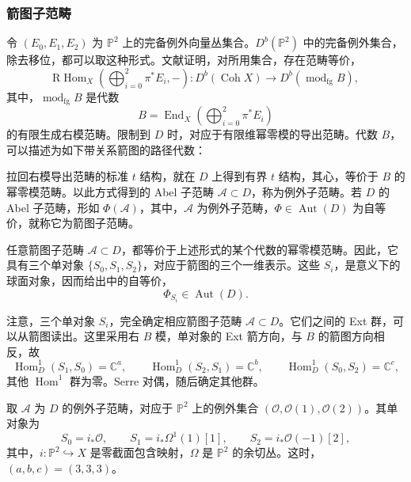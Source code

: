 \subsubsection{箭图子范畴}\label{sec:5.8.3.1}

令 $(E_0,E_1,E_2)$ 为 $\mathbb{P}^2$ 上的完备例外向量丛集合。$D^b(\mathbb{P}^2)$ 中的完备例外集合，除去移位，都可以取这种形式。文献证明，对所用集合，存在范畴等价，
\[
\mathrm{R}\operatorname{Hom}_X\!\left(\bigoplus_{i=0}^2\pi^*E_i,-\right)
\colon D^b(\operatorname{Coh}X)\longrightarrow D^b(\operatorname{mod}_{\mathrm{fg}}B),
\]
其中，$\operatorname{mod}_{\mathrm{fg}}B$ 是代数
\[
B=\operatorname{End}_X\!\left(\bigoplus_{i=0}^2\pi^*E_i\right)
\]
的有限生成右模范畴。限制到 $D$ 时，对应于有限维幂零模的导出范畴。代数 $B$，可以描述为如下带关系箭图的路径代数：
\begin{figure}[H]
\centering
{}
\end{figure}

拉回右模导出范畴的标准 $t$ 结构，就在 $D$ 上得到有界 $t$ 结构，其心，等价于 $B$ 的幂零模范畴。以此方式得到的 Abel 子范畴 $\mathcal{A}\subset D$，称为例外子范畴。若 $D$ 的 Abel 子范畴，形如 $\Phi(\mathcal{A})$，其中，$\mathcal{A}$ 为例外子范畴，$\Phi\in\operatorname{Aut}(D)$ 为自等价，就称它为箭图子范畴。

任意箭图子范畴 $\mathcal{A}\subset D$，都等价于上述形式的某个代数的幂零模范畴。因此，它具有三个单对象 $\{S_0,S_1,S_2\}$，对应于箭图的三个一维表示。这些 $S_i$，是意义下的球面对象，因而给出中的自等价，
\[
\Phi_{S_i}\in\operatorname{Aut}(D).
\]

注意，三个单对象 $S_i$，完全确定相应箭图子范畴 $\mathcal{A}\subset D$。它们之间的 Ext 群，可以从箭图读出。这里采用右 $B$ 模，单对象的 Ext 箭方向，与 $B$ 的箭图方向相反，故
\[
\operatorname{Hom}_D^1(S_1,S_0)=\mathbb{C}^a,\qquad
\operatorname{Hom}_D^1(S_2,S_1)=\mathbb{C}^b,\qquad
\operatorname{Hom}_D^1(S_0,S_2)=\mathbb{C}^c,
\]
其他 $\operatorname{Hom}^1$ 群为零。Serre 对偶，随后确定其他群。

\begin{example}\label{ex:5.43}
取 $\mathcal{A}$ 为 $D$ 的例外子范畴，对应于 $\mathbb{P}^2$ 上的例外集合 $(\mathcal{O},\mathcal{O}(1),\mathcal{O}(2))$。其单对象为
\[
S_0=i_*\mathcal{O},\qquad
S_1=i_*\Omega^1(1)[1],\qquad
S_2=i_*\mathcal{O}(-1)[2],
\]
其中，$i\colon\mathbb{P}^2\hookrightarrow X$ 是零截面包含映射，$\Omega$ 是 $\mathbb{P}^2$ 的余切丛。这时，$(a,b,c)=(3,3,3)$。
\end{example}

